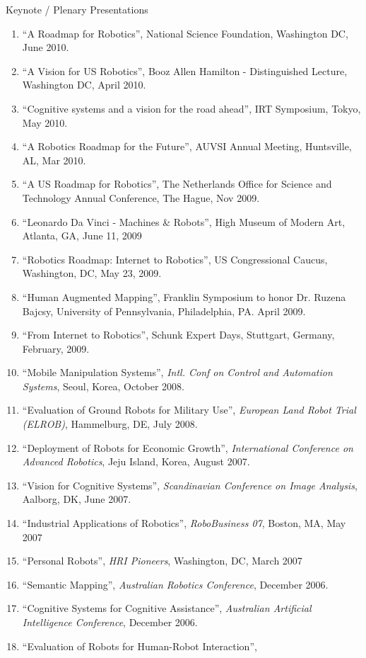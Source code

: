 \documentclass{article}
\begin{document}
\begin{cv}
\begin{cvlist}{Keynote / Plenary Presentations}
\begin{enumerate}
  \item ``A Roadmap for Robotics'', National Science Foundation,  Washington DC, June 2010.
  \item ``A Vision for US Robotics'', Booz Allen Hamilton -  Distinguished Lecture, Washington DC, April 2010.
  \item ``Cognitive systems and a vision for the road ahead'', IRT  Symposium, Tokyo, May 2010.
  \item ``A Robotics Roadmap for the Future'', AUVSI Annual Meeting, Huntsville, AL, Mar 2010.
  \item ``A US Roadmap for Robotics'', The Netherlands Office for Science and Technology Annual Conference, The Hague, Nov 2009.
  \item ``Leonardo Da Vinci - Machines \& Robots'', High Museum of Modern Art, Atlanta, GA, June 11, 2009
  \item ``Robotics Roadmap: Internet to Robotics'', US Congressional Caucus, Washington, DC, May 23, 2009.
  \item ``Human Augmented Mapping'', Franklin Symposium to honor Dr. Ruzena Bajcsy, University of Pennsylvania, Philadelphia,
    PA. April 2009.
  \item ``From Internet to Robotics'', Schunk Expert Days, Stuttgart, Germany, February, 2009.
  \item ``Mobile Manipulation Systems'', {\em Intl. Conf on Control
    and Automation Systems}, Seoul, Korea, October 2008.
  \item ``Evaluation of Ground Robots for Military Use'', {\em
    European Land Robot Trial (ELROB)}, Hammelburg, DE, July 2008.
  \item ``Deployment of Robots for Economic Growth'', {\em
    International Conference on Advanced Robotics}, Jeju Island,
    Korea, August 2007.
  \item ``Vision for Cognitive Systems'', {\em Scandinavian Conference
    on Image Analysis}, Aalborg, DK, June 2007.
  \item ``Industrial Applications of Robotics'', {\em RoboBusiness
    07}, Boston, MA, May 2007
  \item ``Personal Robots'', {\em HRI Pioneers}, Washington, DC, March
    2007
  \item ``Semantic Mapping'', {\em Australian Robotics Conference},
    December 2006.
  \item ``Cognitive Systems for Cognitive Assistance'', {\em
    Australian Artificial Intelligence Conference}, December 2006.
  \item ``Evaluation of Robots for Human-Robot Interaction'', {\em
}
\end{enumerate}
\end{cvlist}
\end{cv}
\end{document}
